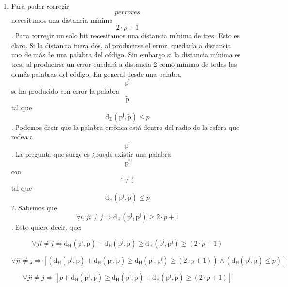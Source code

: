 \begin{enumerate}
\begin{enumerate}
\begin{enumerate}
\begin{enumerate}
        única más cercana del código. El principio de corrección es el
        máxima verosimilitud.
      \item
        Para poder corregir\[p\mathit{errores}\]necesitamos una
        distancia mínima\[{2 \cdot p} + 1\]. Para corregir un solo bit
        necesitamos una distancia mínima de tres. Esto es claro. Si la
        distancia fuera dos, al producirse el error, quedaría a
        distancia uno de más de una palabra del código. Sin embargo si
        la distancia mínima es tres, al producirse un error quedará a
        distancia 2 como mínimo de todas las demás palabras del
        códi\-go. En general desde una palabra
        \[\mathtt{\mathrm{p^{i}}}\] se ha producido con error la palabra
        \[\mathtt{\mathrm{\widetilde{p}}}\]tal que
        \[\mathtt{\mathrm{d_{H}}}{\left( {\mathtt{\mathrm{p^{i}}},\mathtt{\mathrm{\widetilde{p}}}} \right) \leq p}\].
        Podemos decir que la palabra errónea está dentro del radio de la
        esfera que rodea a \[\mathtt{\mathrm{p^{i}}}\]. La pregunta que
        surge es ¿puede existir una palabra
        \[\mathtt{\mathrm{p^{j}}}\]con \[\mathtt{\mathrm{i \neq j}}\]tal
        que
        \[\mathtt{\mathrm{d_{H}}}{\left( {\mathtt{\mathrm{p^{j}}},\mathtt{\mathrm{\widetilde{p}}}} \right) \leq p}\]?.
        Sabemos que
        \[\forall i,j{i \neq j}\Rightarrow\mathtt{\mathrm{d_{H}}}{\left( {\mathtt{\mathrm{p^{i}}},\mathtt{\mathrm{p^{j}}}} \right) \geq {{2 \cdot p} + 1}}\].
        Esto quiere decir, que:

        \[\forall j{i \neq j}\Rightarrow\mathtt{\mathrm{d_{H}}}{\left( {\mathtt{\mathrm{p^{i}}},\mathtt{\mathrm{\widetilde{p}}}} \right) + \mathtt{\mathrm{d_{H}}}}{\left( {\mathtt{\mathrm{p^{j}}},\mathtt{\mathrm{\widetilde{p}}}} \right) \geq \mathtt{\mathrm{d_{H}}}}{\left( {\mathtt{\mathrm{p^{i}}},\mathtt{\mathrm{p^{j}}}} \right) \geq \left( {{2 \cdot p} + 1} \right)}\]

        \[\forall j{i \neq j}\Rightarrow\left\lbrack {\left( {\mathtt{\mathrm{d_{H}}}{\left( {\mathtt{\mathrm{p^{i}}},\mathtt{\mathrm{\widetilde{p}}}} \right) + \mathtt{\mathrm{d_{H}}}}{\left( {\mathtt{\mathrm{p^{j}}},\mathtt{\mathrm{\widetilde{p}}}} \right) \geq \mathtt{\mathrm{d_{H}}}}{\left( {\mathtt{\mathrm{p^{i}}},\mathtt{\mathrm{p^{j}}}} \right) \geq \left( {{2 \cdot p} + 1} \right)}} \right) \land \left( {\mathtt{\mathrm{d_{H}}}{\left( {\mathtt{\mathrm{p^{i}}},\mathtt{\mathrm{\widetilde{p}}}} \right) \leq p}} \right)} \right\rbrack\]

        \[\forall j{i \neq j}\Rightarrow\left\lbrack {{p + \mathtt{\mathrm{d_{H}}}}{\left( {\mathtt{\mathrm{p^{j}}},\mathtt{\mathrm{\widetilde{p}}}} \right) \geq \mathtt{\mathrm{d_{H}}}}{\left( {\mathtt{\mathrm{p^{i}}},\mathtt{\mathrm{\widetilde{p}}}} \right) + \mathtt{\mathrm{d_{H}}}}{\left( {\mathtt{\mathrm{p^{j}}},\mathtt{\mathrm{\widetilde{p}}}} \right) \geq \left( {{2 \cdot p} + 1} \right)}} \right\rbrack\]


\end{enumerate}
\end{enumerate}
\end{enumerate}
\end{enumerate}
